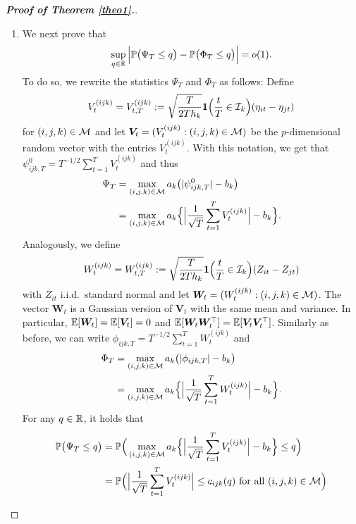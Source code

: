 \documentclass[a4paper,12pt]{article}
\numberwithin{equation}{section}
\begin{document}
\begin{proof}[\textnormal{\textbf{Proof of Theorem \ref{theo1}.}}]
\begin{enumerate}[label=\textit{Step \arabic*.}, leftmargin=0cm, itemindent=1.45cm]
\item We next prove that 
\begin{equation}\label{eq:kolmogorov-distance}
\sup_{q \in \mathbb{R}} \Big| \mathbb{P} \big( \Psi_T \le q \big) - \mathbb{P} \big( \Phi_T \le q \big) \Big| = o(1).
\end{equation}
To do so, we rewrite the statistics $\Psi_T$ and $\Phi_T$ as follows: Define 
\begin{equation*}
V^{(ijk)}_t = V^{(ijk)}_{t,T} := \sqrt{\frac{T}{2Th_k}} \boldsymbol{1}\Big(\frac{t}{T} \in \mathcal{I}_k\Big) (\eta_{it} - \eta_{jt})
\end{equation*}
for $(i,j,k) \in \mathcal{M}$ and let $\boldsymbol{V}_t = (V_t^{(ijk)}: (i,j,k) \in \mathcal{M})$ be the $p$-dimensional random vector with the entries $V_t^{(ijk)}$. With this notation, we get that $\psi_{ijk,T}^0 = T^{-1/2} \sum_{t=1}^T V^{(ijk)}_t$ and thus 
\begin{align*}
\Psi_T 
 & = \max_{(i,j,k) \in \mathcal{M}}  a_k \big( |\psi_{ijk,T}^0| - b_k \big) \\
 & = \max_{(i,j,k) \in \mathcal{M}} a_k \Big\{ \Big|\frac{1}{\sqrt{T}} \sum_{t=1}^T V^{(ijk)}_t\Big| - b_k \Big\}.
\end{align*} 
Analogously, we define 
\begin{equation*}
W^{(ijk)}_t = W^{(ijk)}_{t,T} := \sqrt{\frac{T}{2Th_k}} \boldsymbol{1}\Big(\frac{t}{T} \in \mathcal{I}_k\Big) (Z_{it} - Z_{jt})
\end{equation*}
with $Z_{it}$ i.i.d.\ standard normal and let $\boldsymbol{W}_t = (W_t^{(ijk)}: (i,j,k) \in \mathcal{M})$. The vector $\boldsymbol{W}_t$ is a Gaussian version of $\boldsymbol{V}_t$ with the same mean and variance. In particular, $\mathbb{E}[\boldsymbol{W}_t] = \mathbb{E}[\boldsymbol{V}_t] = 0$ and $\mathbb{E}[\boldsymbol{W}_t \boldsymbol{W}_t^\top] = \mathbb{E}[\boldsymbol{V}_t \boldsymbol{V}_t^\top]$. Similarly as before, we can write $\phi_{ijk,T} = T^{-1/2} \sum_{t=1}^T W^{(ijk)}_t$ and  
\begin{align*}
\Phi_T 
 & = \max_{(i,j,k) \in \mathcal{M}} a_k \big( |\phi_{ijk,T}| - b_k \big) \\
 & = \max_{(i,j,k) \in \mathcal{M}} a_k \Big\{ \Big|\frac{1}{\sqrt{T}} \sum_{t=1}^T W^{(ijk)}_t\Big| - b_k \Big\}.
\end{align*} 
For any $q \in \mathbb{R}$, it holds that
\begin{align*}
\pr \big( \Psi_T \le q \big) 
 & = \pr \Big( \max_{(i,j,k) \in \indexset} a_k \Big\{ \Big|\frac{1}{\sqrt{T}} \sum_{t=1}^T V^{(ijk)}_t\Big| - b_k \Big\} \le q \Big) \\
 & = \pr \Big( \Big|\frac{1}{\sqrt{T}} \sum_{t=1}^T V^{(ijk)}_t\Big| \le c_{ijk}(q) \text{ for all } (i,j,k) \in \indexset \Big) \\

\end{align*}
\end{enumerate}
\end{proof}
\end{document}
